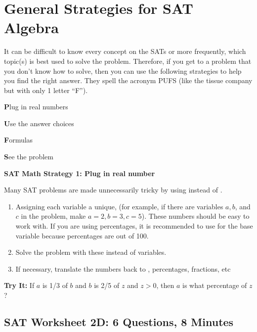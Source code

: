 \vfill
\pagebreak
\section[SAT Algebra]{General Strategies for SAT Algebra}

It can be difficult to know every concept on the SATs or more frequently, which topic(s) is best used to solve the problem. Therefore, if you get to a problem that you don't know how to solve, then you can use the following strategies to help you find the right answer. They spell the acronym PUFS (like the tissue company but with only 1 letter ``F'').

\bigskip
\textbf{\large P}lug in real numbers

\medskip
\textbf{\large U}se the answer choices

\medskip
\textbf{\large F}ormulas

\medskip
\textbf{\large S}ee the problem

\hrulefill

\textbf{SAT Math Strategy 1: Plug in real number}

\bigskip
Many SAT problems are made unnecessarily tricky by using \longline instead of \longline.

\begin{enumerate}
\item Assigning each variable a unique, \longline (for example, if there are variables $a, b$, and $c$ in the problem, make $a=2, b=3, c=5$). These numbers should be easy to work with. If you are using percentages, it is recommended to use \longline for the base variable because percentages are out of 100.
\item Solve the problem with these \longline instead of variables.
\item If necessary, translate the numbers back to \longline, percentages, fractions, etc
\end{enumerate}

\textbf{Try It:} If $a$ is 1/3 of $b$ and $b$ is 2/5 of $z$ and $z>0$, then $a$ is what percentage of $z$?

\pagebreak
\subsection{SAT Worksheet 2D: 6 Questions, 8 Minutes}

